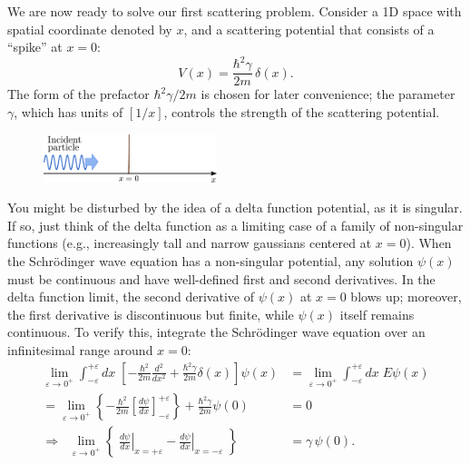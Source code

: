 \documentclass[pra,12pt]{revtex4}
\begin{document}
We are now ready to solve our first scattering problem.  Consider a 1D
space with spatial coordinate denoted by $x$, and a scattering
potential that consists of a ``spike'' at $x = 0$:
$$V(x) = \frac{\hbar^2\gamma}{2m} \,\delta(x).$$
The form of the prefactor $\hbar^2\gamma/2m$ is chosen for later
convenience; the parameter $\gamma$, which has units of $[1/x]$,
controls the strength of the scattering potential.

\begin{figure}[h]
  \centering\includegraphics[width=0.45\textwidth]{scattering1d}
\end{figure}

You might be disturbed by the idea of a delta function potential, as
it is singular.  If so, just think of the delta function as a limiting
case of a family of non-singular functions (e.g., increasingly tall
and narrow gaussians centered at $x=0$).  When the Schr\"odinger wave
equation has a non-singular potential, any solution $\psi(x)$ must be
continuous and have well-defined first and second derivatives.  In the
delta function limit, the second derivative of $\psi(x)$ at $x=0$
blows up; moreover, the first derivative is discontinuous but finite,
while $\psi(x)$ itself remains continuous.  To verify this, integrate
the Schr\"odinger wave equation over an infinitesimal range around $x
= 0$:
$$\begin{aligned}\lim_{\varepsilon\rightarrow 0^+} \int_{-\varepsilon}^{+\varepsilon} dx\; \left[-\frac{\hbar^2}{2m} \frac{d^2}{dx^2} + \frac{\hbar^2\gamma}{2m} \delta(x)\right] \psi(x) &= \lim_{\varepsilon\rightarrow 0^+} \int_{-\varepsilon}^{+\varepsilon} dx\; E \psi(x) \\ = \lim_{\varepsilon\rightarrow 0^+} \left\{-\frac{\hbar^2}{2m} \left[\frac{d\psi}{dx}\right]_{-\varepsilon}^{+\varepsilon} \right\} + \frac{\hbar^2\gamma}{2m} \psi(0) &= 0\\ \Rightarrow \;\; \lim_{\varepsilon\rightarrow 0^+} \left\{\; \left.\frac{d\psi}{dx}\right|_{x = +\varepsilon} - \left.\frac{d\psi}{dx}\right|_{x = -\varepsilon}\; \right\}  &=  \gamma \,\psi(0).\end{aligned}$$
\end{document}
